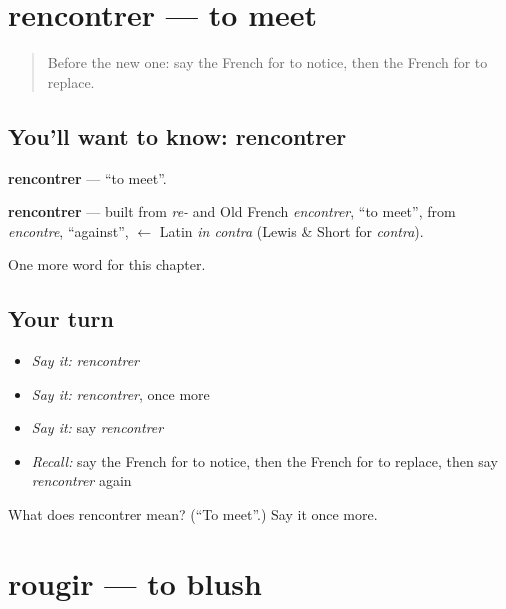 \section[rencontrer]{rencontrer — to meet}

\label{lesson:FR-C153-rencontrer}



\begin{quote}
Before the new one: say the French for to notice, then the French for to replace.
\end{quote}

\subsection*{You'll want to know: rencontrer}
\textbf{rencontrer} — \textquotedblleft{}to meet\textquotedblright{}.

\begin{cousinweb}
\textbf{rencontrer} — built from \emph{re-} and Old French \emph{encontrer}, \textquotedblleft{}to meet\textquotedblright{}, from \emph{encontre}, \textquotedblleft{}against\textquotedblright{}, $\leftarrow$ Latin \emph{in contra} (Lewis \& Short for \emph{contra}).
\end{cousinweb}

\begin{grammarlens}[title={What you've built}]
One more word for this chapter.
\end{grammarlens}

\subsection*{Your turn}
\begin{itemize}
\raggedright
  \item \emph{Say it:} \emph{rencontrer}
  \item \emph{Say it:} \emph{rencontrer}, once more
  \item \emph{Say it:} say \emph{rencontrer}
  \item \emph{Recall:} say the French for to notice, then the French for to replace, then say \emph{rencontrer} again
\end{itemize}

\begin{tcolorbox}[breakable,colback=teal!4,colframe=teal!35!black,title={Before you move on}]
What does rencontrer mean? (\textquotedblleft{}To meet\textquotedblright{}.) Say it once more.
\end{tcolorbox}
\section[rougir]{rougir — to blush}

